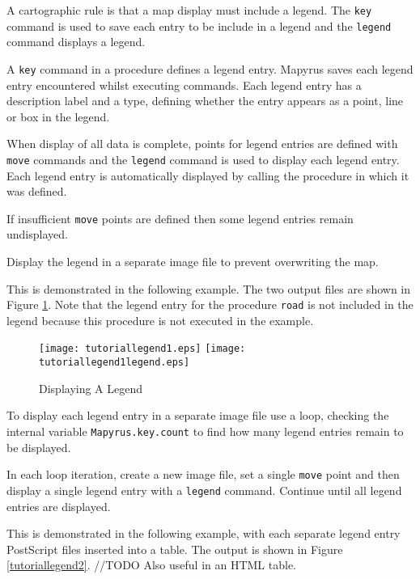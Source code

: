 A cartographic rule is that a map display must include a legend.  The
\texttt{key} command is used to save each entry to be include in a legend and
the \texttt{legend} command displays a legend.

A \texttt{key} command in a procedure defines a legend entry.  Mapyrus saves
each legend entry encountered whilst executing commands.  Each legend entry has
a description label and a type, defining whether the entry appears as a point,
line or box in the legend.

When display of all data is complete, points for legend entries are defined
with \texttt{move} commands and the \texttt{legend} command is used to display
each legend entry.  Each legend entry is automatically displayed by calling the
procedure in which it was defined.

If insufficient \texttt{move} points are defined then some legend entries
remain undisplayed.

Display the legend in a separate image file to prevent overwriting the map.

This is demonstrated in the following example.
The two output files are shown in Figure \ref{tutoriallegend1}.
Note that the legend entry for the procedure \texttt{road} is
not included in the legend because this procedure is not
executed in the example.



\begin{figure}[h]
\texttt{[image: tutoriallegend1.eps]}
\texttt{[image: tutoriallegend1legend.eps]}
\caption{Displaying A Legend}
\label{tutoriallegend1}
\end{figure}

To display each legend entry in a separate image file use a loop, checking the
internal variable \texttt{Mapyrus.key.count} to find how many legend entries
remain to be displayed.

In each loop iteration, create a new image file, set a single \texttt{move}
point and then display a single legend entry with a \texttt{legend} command.
Continue until all legend entries are displayed.

This is demonstrated in the following example, with each separate
legend entry PostScript files inserted into a table.
The output is shown in Figure \ref{tutoriallegend2}.
//TODO Also useful in an HTML table.



